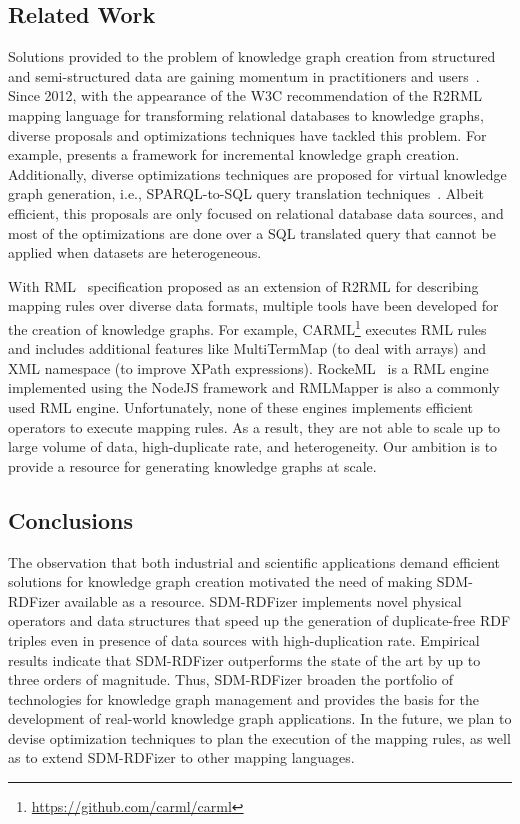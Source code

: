 \subsection{Related Work}
\label{sec:rw}
Solutions provided to the problem of knowledge graph creation from structured and semi-structured data are gaining momentum in practitioners and users~\citep{corcho2019towards}. Since 2012, with the appearance of the W3C recommendation of the R2RML~\citep{R2RML} mapping language for transforming relational databases to knowledge graphs, diverse proposals and optimizations techniques have tackled this problem. For example, \citep{gawriljuk2016scalable} presents a framework for incremental knowledge graph creation. Additionally, diverse optimizations techniques are proposed for virtual knowledge graph generation\citep{calvanese2017ontop,priyatna2014formalisation}, i.e., SPARQL-to-SQL query translation techniques~\citep{chebotko2009semantics}. Albeit efficient, this proposals are only focused on relational database data sources, and most of the optimizations are done over a SQL translated query that cannot be applied when datasets are heterogeneous.

With RML~\citep{dimou2014rml} specification proposed as an extension of R2RML for describing mapping rules over diverse data formats, multiple tools have been developed for the creation of knowledge graphs. For example, CARML\footnote{\url{https://github.com/carml/carml}} executes RML rules and includes additional features like MultiTermMap (to deal with arrays) and XML namespace (to improve XPath expressions). RockeML~\citep{csimcsek2019rocketrml} is a RML engine implemented using the NodeJS framework and RMLMapper is also a commonly used RML engine. Unfortunately, none of these engines implements efficient operators to execute mapping rules. As a result, they are not able to scale up to large volume of data, high-duplicate rate, and heterogeneity. Our ambition is to provide a resource for generating knowledge graphs at scale.

\subsection{Conclusions}
\label{sec:conclusion}
The observation that both industrial and scientific applications demand efficient solutions for knowledge graph creation motivated the need of making SDM-RDFizer available as a resource. SDM-RDFizer implements novel physical operators and data structures that speed up the generation of duplicate-free RDF triples even in presence of data sources with high-duplication rate. Empirical results indicate that SDM-RDFizer outperforms the state of the art by up to three orders of magnitude. Thus, SDM-RDFizer broaden the portfolio of technologies for knowledge graph management and provides the basis for the development of real-world knowledge graph applications. In the future, we plan to devise optimization techniques to plan the execution of the mapping rules, as well as to extend SDM-RDFizer to other mapping languages.